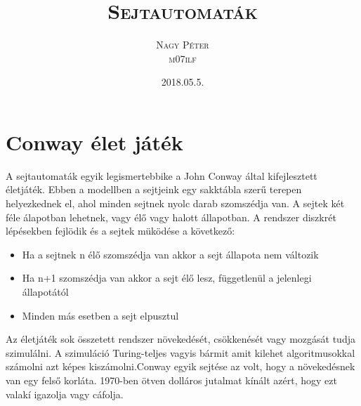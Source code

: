 \documentclass[paper=a4, fontsize=11pt]{article}
\title{\scshape\Huge Sejtautomaták }
\date{\scshape\Large 2018.05.5.}
\author{\scshape\huge Nagy Péter\\\scshape\huge m07ilf}
\begin{document}
\maketitle
\newpage

 
\tableofcontents
\newpage




\section{Conway élet játék}
A sejtautomaták egyik legismertebbike a John Conway által kifejlesztett életjáték. Ebben a modellben a sejtjeink egy sakktábla szerű terepen helyezkednek el, ahol minden sejtnek nyolc darab szomszédja van. A sejtek két féle álapotban lehetnek, vagy élő vagy halott állapotban. A rendszer diszkrét lépésekben fejlödik és a sejtek müködése a következő:

\begin{itemize}
\item Ha a sejtnek n élő szomszédja van akkor a sejt állapota nem változik
\item Ha n+1 szomszédja van akkor a sejt élő lesz, függetlenül a jelenlegi állapotától
\item Minden más esetben a sejt elpusztul
\end{itemize}


Az életjáték sok összetett rendszer növekedését, csökkenését vagy mozgását tudja szimulálni. 
A szimuláció Turing-teljes vagyis bármit amit kilehet algoritmusokkal számolni azt képes kiszámolni.Conway egyik sejtése az volt, hogy a növekedésnek van egy felső korláta. 1970-ben ötven dolláros jutalmat kínált azért, hogy ezt valakí igazolja vagy cáfolja.
\end{document}
